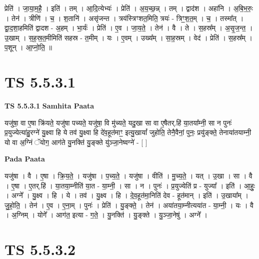 \documentclass[17pt]{extarticle}
\begin{document}
प्रेति॑ । जा॒या॒म॒है॒ । इति॑ । तम् । आ॒दि॒त्येभ्यः॑ । प्रेति॑ । अ॒य॒च्छ॒न्न् । तम् । द्वाद॑श । अहा॑नि । अ॒बि॒भ॒रुः॒ । तेन॑ । त्रीणि॑ । च॒ । श॒तानि॑ । असृ॑जन्त । त्रय॑स्त्रिꣳशत॒मिति॒ त्रयः॑ - त्रिꣳ॒॒श॒त॒म् । च॒ । तस्मा᳚त् । द्वा॒द॒शा॒हमिति॑ द्वादश - अ॒हम् । भा॒र्यः॑ । प्रेति॑ । ए॒व । जा॒य॒ते॒ । तेन॑ । वै । ते । स॒हस्र᳚म् । अ॒सृ॒ज॒न्त॒ । उ॒खाम् । स॒ह॒स्र॒त॒मीमिति॑ सहस्र - त॒मीम् । यः । ए॒वम् । उख्य᳚म् । सा॒ह॒स्रम् । वेद॑ । प्रेति॑ । स॒हस्र᳚म् । प॒शून् । आ॒प्नो॒ति॒ ॥  \newline




\section*{ TS 5.5.3.1 }

\textbf{TS 5.5.3.1 } \newline
\textbf{Samhita Paata} \newline

यजु॑षा॒ वा ए॒षा क्रि॑यते॒ यजु॑षा पच्यते॒ यजु॑षा॒ वि मु॑च्यते॒ यदु॒खा सा वा ए॒षैतर्.हि॑ या॒तया᳚म्नी॒ सा न पुनः॑ प्र॒युज्येत्या॑हु॒रग्ने॑ यु॒क्ष्वा हि ये तव॑ यु॒क्ष्वा हि दे॑व॒हूत॑माꣳ॒॒ इत्यु॒खायां᳚ जुहोति॒ तेनै॒वैनां॒ पुनः॒ प्रयु॑ङ्क्ते॒ तेनाया॑तयाम्नी॒ यो वा अ॒ग्निं ॅयोग॒ आग॑ते यु॒नक्ति॑ यु॒ङ्क्ते यु॑ञ्जा॒नेष्वग्ने॑ - [  ] \newline

\textbf{Pada Paata} \newline

यजु॑षा । वै । ए॒षा । क्रि॒य॒ते॒ । यजु॑षा । प॒च्य॒ते॒ । यजु॑षा । वीति॑ । मु॒च्य॒ते॒ । यत् । उ॒खा । सा । वै । ए॒षा । ए॒तर्.हि॑ । या॒तया॒म्नीति॑ या॒त - या॒म्नी॒ । सा । न । पुनः॑ । प्र॒युज्येति॑ प्र - युज्या᳚ । इति॑ । आ॒हुः॒ । अग्ने᳚ । यु॒क्ष्व । हि । ये । तव॑ । यु॒क्ष्व । हि । दे॒व॒हूत॑मा॒निति॑ देव - हूत॑मान् । इति॑ । उ॒खाया᳚म् । जु॒हो॒ति॒ । तेन॑ । ए॒व । ए॒ना॒म् । पुनः॑ । प्रेति॑ । यु॒ङ्क्ते॒ । तेन॑ । अया॑तया॒म्नीत्यया॑त - या॒म्नी॒ । यः । वै । अ॒ग्निम् । योगे᳚ । आग॑त॒ इत्या - ग॒ते॒ । यु॒नक्ति॑ । यु॒ङ्क्ते । यु॒ञ्जा॒नेषु॑ । अग्ने᳚ ।  \newline




\section*{ TS 5.5.3.2 }
\end{document}
